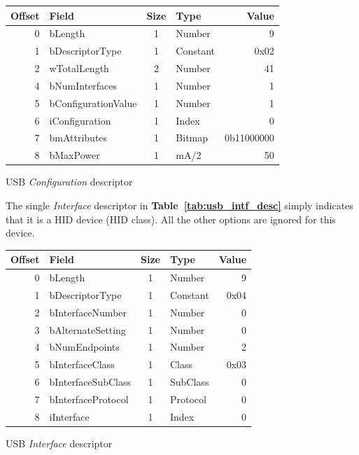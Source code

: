 \documentclass[a4paper,10pt]{article}
\makeatletter
\newenvironment{tablehere}{\def\@captype{table}\vspace{2ex}}{\vspace{2ex}}
\newcommand{\citet}[1]{\textbf{Table~\ref{#1}}}
\makeatother
\begin{document}
\begin{multicols}{2}
\begin{tablehere}
\centering \footnotesize
\begin{tabular}{|r|l|c|l|r|}
\hline
\textbf{Offset} & \textbf{Field} & \textbf{Size} & \textbf{Type} & \textbf{Value}	\\
\hline
0	& bLength				& 1	& Number	& 9				\\
1	& bDescriptorType		& 1	& Constant	& 0x02			\\
2	& wTotalLength			& 2	& Number	& 41			\\
4	& bNumInterfaces		& 1	& Number	& 1				\\
5	& bConfigurationValue	& 1	& Number	& 1				\\
6	& iConfiguration		& 1	& Index		& 0				\\
7	& bmAttributes			& 1	& Bitmap	& 0b11000000	\\
8	& bMaxPower				& 1	& mA/2		& 50			\\
\hline
\end{tabular}
\caption{USB \emph{Configuration} descriptor}
\label{tab:usb_config_desc}
\end{tablehere}

The single \emph{Interface} descriptor in \citet{tab:usb_intf_desc} simply
indicates that it is a HID device (HID class). All the other options are
ignored for this device.

\begin{tablehere}
\centering \footnotesize
\begin{tabular}{|r|l|c|l|r|}
\hline
\textbf{Offset} & \textbf{Field} & \textbf{Size} & \textbf{Type} & \textbf{Value}	\\
\hline
0	& bLength				& 1	& Number	& 9			\\
1	& bDescriptorType		& 1	& Constant	& 0x04		\\
2	& bInterfaceNumber		& 1	& Number	& 0			\\
3	& bAlternateSetting		& 1	& Number	& 0			\\
4	& bNumEndpoints			& 1	& Number	& 2			\\
5	& bInterfaceClass		& 1	& Class		& 0x03		\\
6	& bInterfaceSubClass	& 1	& SubClass	& 0			\\
7	& bInterfaceProtocol	& 1	& Protocol	& 0			\\
8	& iInterface			& 1	& Index		& 0			\\
\hline
\end{tabular}
\caption{USB \emph{Interface} descriptor}
\label{tab:usb_intf_desc}
\end{tablehere}


\end{multicols}
\end{document}
